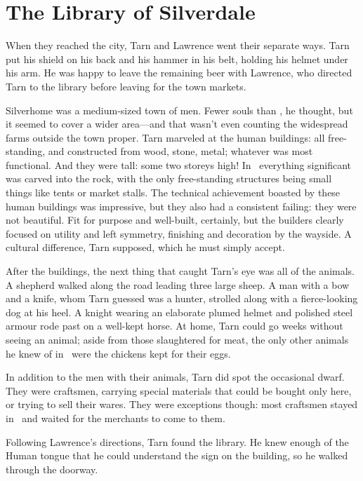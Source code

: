 \chapter{The Library of Silverdale}

When they reached the city, Tarn and Lawrence went their separate ways.  Tarn put his shield on his back and his hammer in his belt, holding his helmet under his arm.  He was happy to leave the remaining beer with Lawrence, who directed Tarn to the library before leaving for the town markets.

Silverhome was a medium-sized town of men.  Fewer souls than \korbarthrond, he thought, but it seemed to cover a wider area---and that wasn't even counting the widespread farms outside the town proper.  Tarn marveled at the human buildings: all free-standing, and constructed from wood, stone, metal; whatever was most functional.  And they were tall: some two storeys high!  In \korbarthrond\ everything significant was carved into the rock, with the only free-standing structures being small things like tents or market stalls.  The technical achievement boasted by these human buildings was impressive, but they also had a consistent failing: they were not beautiful.  Fit for purpose and well-built, certainly, but the builders clearly focused on utility and left symmetry, finishing and decoration by the wayside.  A cultural difference, Tarn supposed, which he must simply accept.

After the buildings, the next thing that caught Tarn's eye was all of the animals.  A shepherd walked along the road leading three large sheep. A man with a bow and a knife, whom Tarn guessed was a hunter, strolled along with a fierce-looking dog at his heel.  A knight wearing an elaborate plumed helmet and polished steel armour rode past on a well-kept horse.  At home, Tarn could go weeks without seeing an animal; aside from those slaughtered for meat, the only other animals he knew of in \korbarthrond\ were the chickens kept for their eggs.

In addition to the men with their animals, Tarn did spot the occasional dwarf.  They were craftsmen, carrying special materials that could be bought only here, or trying to sell their wares.  They were exceptions though: most craftsmen stayed in \korbarthrond\ and waited for the merchants to come to them.

Following Lawrence's directions, Tarn found the library.  He knew enough of the Human tongue that he could understand the sign on the building, so he walked through the doorway.

